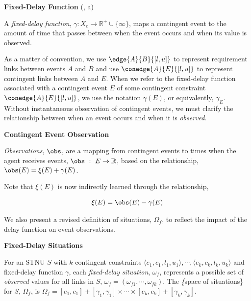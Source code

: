 \documentclass[11pt]{article}
\begin{document}
\begin{defn}
\textbf{Fixed-Delay Function} (, a)

A \emph{fixed-delay function}, \(\gamma: X_c \rightarrow \mathbb{R}^+ \cup \{\infty\}\), maps a contingent
event to the amount of time that passes between when the event occurs and when its value is
observed.
\end{defn}

As a matter of convention, we use \(\edge{A}{B}{[l, u]}\) to represent requirement links between
events \(A\) and \(B\) and use \(\conedge{A}{E}{[l, u]}\) to represent contingent links between \(A\) and
\(E\). When we refer to the fixed-delay function associated with a contingent event \(E\) of some
contingent constraint \(\conedge{A}{E}{[l, u]}\), we use the notation \(\gamma(E)\), or equivalently,
\(\gamma_{E}\). Without instantaneous observation of contingent events, we must clarify the
relationship between when an event occurs and when it is \emph{observed}.

\begin{defn}
\textbf{Contingent Event Observation}

\emph{Observations}, \(\obs\), are a mapping from contingent events to times when the agent receives
events, \(\obs~:~E \rightarrow \mathbb{R}\), based on the relationship, \(\obs(E) = \xi(E) +
\gamma(E)\).
\end{defn}

Note that \(\xi(E)\) is now indirectly learned through the relationship,

$$
\xi(E) = \obs(E) - \gamma(E)
$$

We also present a revised definition of situations, \(\Omega_{f}\), to reflect the impact of the delay
function on event observations.

\begin{defn}
\label{defn:omega-f}
\textbf{Fixed-Delay Situations}

For an STNU \(S\) with \(k\) contingent constraints \(\langle e_{1}, c_{1}, l_{1}, u_{1} \rangle, \cdots,
\langle e_{k}, c_{k}, l_{k}, u_{k} \rangle\) and fixed-delay function \(\gamma\), each
\textit{fixed-delay situation}, \(\omega_{f}\), represents a possible set of \textit{observed} values
for all links in \(S\), \(\omega_{f} = (\omega_{f1}, \cdots, \omega_{fk})\). The \textit\{space of
situations\} for \(S\), \(\Omega_{f}\), is \(\Omega_{f} = [e_{1}, c_{1}] + [\gamma_{1}, \gamma_{1}] \times
\cdots \times [e_{k}, c_{k}] + [\gamma_{k}, \gamma_{k}]\).
\end{defn}
\end{document}
